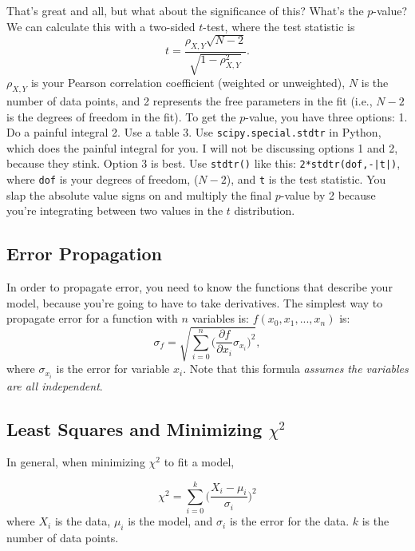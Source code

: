 That's great and all, but what about the significance of this? What's the $p$-value? We can calculate this with a two-sided $t$-test, where the test statistic is
\begin{equation}
    t = \frac{\rho_{X,Y}\sqrt{N-2}}{\sqrt{1-\rho_{X,Y}^{2}}}.
\end{equation}
$\rho_{X,Y}$ is your Pearson correlation coefficient (weighted or unweighted), $N$ is the number of data points, and 2 represents the free parameters in the fit (i.e., $N-2$ is the degrees of freedom in the fit). To get the $p$-value, you have three options: 1. Do a painful integral 2. Use a table 3. Use \texttt{scipy.special.stdtr} in Python, which does the painful integral for you. I will not be discussing options 1 and 2, because they stink. Option 3 is best. Use \texttt{stdtr()} like this: \texttt{2*stdtr(dof,-|t|)}, where \texttt{dof} is your degrees of freedom, ($N-2$), and \texttt{t} is the test statistic. You slap the absolute value signs on and multiply the final $p$-value by 2 because you're integrating between two values in the $t$ distribution.

\subsection{Error Propagation}
\label{sec:errorprop}
In order to propagate error, you need to know the functions that describe your model, because you're going to have to take derivatives. The simplest way to propagate error for a function with $n$ variables is: $f(x_{0},x_{1}, ...,  x_{n})$ is:
\begin{equation}
\label{eqn:errorprop}
    \sigma_{f} = \sqrt{\sum_{i=0}^{n}\Big( \frac{\partial f}{\partial x_{i}} \sigma_{x_{i}}\Big)^{2}},
\end{equation}
where $\sigma_{x_{i}}$ is the error for variable $x_{i}$. Note that this formula \textit{assumes the variables are all independent}. 

\subsection{Least Squares and Minimizing $\chi^{2}$}
In general, when minimizing $\chi^{2}$ to fit a model, 

\begin{equation}
    \chi^{2} = \sum_{i=0}^{k} \Big( \frac{X_{i} - \mu_{i}}{\sigma_{i}} \Big)^{2}
\end{equation}
where $X_{i}$ is the data, $\mu_{i}$ is the model, and $\sigma_{i}$ is the error for the data. $k$ is the number of data points. \\

